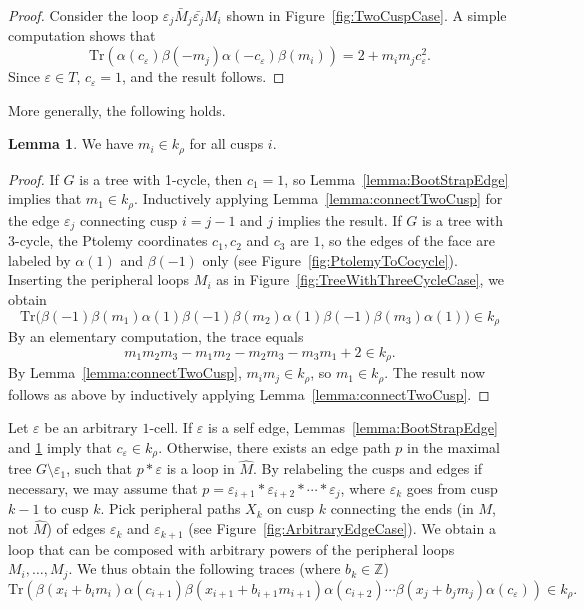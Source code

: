 \documentclass[12pt]{amsart}
\theoremstyle{definition}
\newtheorem{lemma}[theorem]{Lemma}
\numberwithin{equation}{section}
\def\Z{\mathbb{Z}}
\def\Tr{\mathrm{Tr}}
\begin{document}
\begin{proof}
Consider the loop $\varepsilon_j\bar{M}_j\bar{\varepsilon_j}M_i$ shown in Figure~\ref{fig:TwoCuspCase}. A simple computation shows that
\begin{equation}
\Tr(\alpha(c_\varepsilon)\beta(-m_{j})\alpha(-c_{\varepsilon})\beta(m_i))=2+m_i m_{j} c_{\varepsilon}^2.
\end{equation}
Since $\varepsilon\in T$, $c_\varepsilon=1$, and the result follows.
\end{proof}
More generally, the following holds.
\begin{lemma}\label{lemma:AllMiInKRho}
We have $m_i\in k_\rho$ for all cusps $i$.
\end{lemma}

\begin{proof}
If $G$ is a tree with 1-cycle, then $c_1=1$, so Lemma~\ref{lemma:BootStrapEdge} implies that $m_1\in k_\rho$. Inductively applying Lemma~\ref{lemma:connectTwoCusp} for the edge $\varepsilon_j$ connecting cusp $i=j-1$ and $j$ implies the result. If $G$ is a tree with $3$-cycle, the Ptolemy coordinates $c_1,c_2$ and $c_3$ are $1$, so the edges of the face are labeled by $\alpha(1)$ and $\beta(-1)$ only (see Figure~\ref{fig:PtolemyToCocycle}). Inserting the peripheral loops $M_i$ as in Figure~\ref{fig:TreeWithThreeCycleCase}, we obtain
\begin{equation}
\Tr\big(\beta(-1)\beta(m_1)\alpha(1)\beta(-1)\beta(m_2)\alpha(1)\beta(-1)\beta(m_3)\alpha(1)\big)\in k_\rho
\end{equation}
By an elementary computation, the trace equals
\begin{equation}
m_1m_2m_3-m_1m_2-m_2m_3-m_3m_1+2\in k_\rho.
\end{equation}
By Lemma~\ref{lemma:connectTwoCusp}, $m_im_j\in k_\rho$, so $m_1\in k_\rho$. The result now follows as above by inductively applying Lemma~\ref{lemma:connectTwoCusp}.
\end{proof}

Let $\varepsilon$ be an arbitrary $1$-cell. If $\varepsilon$ is a self edge, Lemmas~\ref{lemma:BootStrapEdge} and \ref{lemma:AllMiInKRho} imply that $c_\varepsilon\in k_\rho$. Otherwise, there exists an edge path $p$ in the maximal tree $G\setminus\varepsilon_1$, such that $p*\varepsilon$ is a loop in $\widehat M$. By relabeling the cusps and edges if necessary, we may assume that $p=\varepsilon_{i+1}\!*\!\varepsilon_{i+2}\!*\cdots\!*\!\varepsilon_{j}$, where $\varepsilon_{k}$ goes from cusp $k-1$ to cusp $k$. Pick peripheral paths $X_{k}$ on cusp $k$ connecting the ends (in $M$, not $\widehat M$) of edges $\varepsilon_{k}$ and $\varepsilon_{k+1}$ (see Figure~\ref{fig:ArbitraryEdgeCase}). We obtain a loop that can be composed with arbitrary powers of the peripheral loops $M_{i}, \dots, M_{j}$. We thus obtain the following traces (where $b_k\in\Z$)
\begin{equation}
\Tr(\beta(x_{i}+b_{i}m_{i})\alpha(c_{i+1})\beta(x_{i+1}+b_{i+1}m_{i+1})\alpha(c_{i+2})\cdots \beta(x_{j}+b_jm_j)\alpha(c_\varepsilon))\in k_\rho.
\end{equation}
\end{document}
